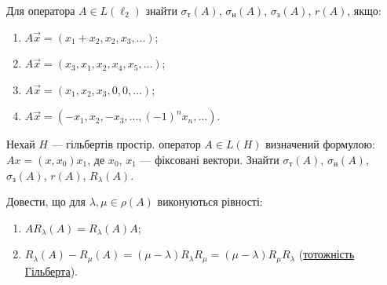 \begin{exercise}
    Для оператора $A \in L(\ell_2)$ знайти 
    $\sigma_\text{т}(A)$, $\sigma_\text{н}(A)$, $\sigma_\text{з}(A)$, $r(A)$, якщо:
    \begin{enumerate}
        \item $A\vec{x} = (x_1 + x_2, x_2, x_3, ...)$;
        \item $A\vec{x} = (x_3 , x_1, x_2, x_4, x_5, ...)$;
        \item $A\vec{x} = (x_1 , x_2, x_3, 0, 0, ...)$;
        \item $A\vec{x} = (-x_1, x_2, -x_3, ..., (-1)^n x_n, ...)$.
    \end{enumerate}
\end{exercise}

\begin{exercise}
    Нехай $H$ --- гільбертів простір. оператор $A \in L(H)$ визначений формулою: 
    $Ax = (x, x_0)x_1$, де $x_0$, $x_1$ --- фіксовані вектори. Знайти
    $\sigma_\text{т}(A)$, $\sigma_\text{н}(A)$, $\sigma_\text{з}(A)$, $r(A)$, $R_\lambda(A)$.
\end{exercise}

\begin{exercise}
    Довести, що для $\lambda, \mu \in \rho(A)$ виконуються рівності: 
    \begin{enumerate}
        \item $AR_\lambda(A) = R_\lambda(A)A$;
        \item $R_\lambda(A) - R_\mu(A) = (\mu - \lambda)R_\lambda R_\mu = (\mu - \lambda) 
        R_\mu R_\lambda$ (\ul{тотожність Гільберта}).
    \end{enumerate}
\end{exercise}